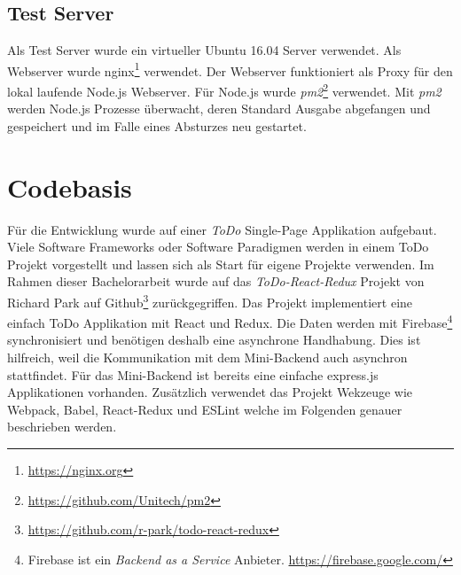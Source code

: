 \subsection{Test Server}
Als Test Server wurde ein virtueller Ubuntu 16.04 Server verwendet. Als Webserver wurde nginx\footnote{\url{https://nginx.org}} verwendet. Der Webserver funktioniert als Proxy für den lokal laufende Node.js Webserver. Für Node.js wurde \textit{pm2}\footnote{\url{https://github.com/Unitech/pm2}} verwendet. Mit \textit{pm2} werden Node.js Prozesse überwacht, deren Standard Ausgabe abgefangen und gespeichert und im Falle eines Absturzes neu gestartet.

\section{Codebasis}
Für die Entwicklung wurde auf einer \textit{ToDo} Single-Page Applikation aufgebaut. Viele Software Frameworks oder Software Paradigmen werden in einem ToDo Projekt vorgestellt und lassen sich als Start für eigene Projekte verwenden. Im Rahmen dieser Bachelorarbeit wurde auf das \textit{ToDo-React-Redux} Projekt von Richard Park auf Github\footnote{\url{https://github.com/r-park/todo-react-redux}} zurückgegriffen. Das Projekt implementiert eine einfach ToDo Applikation mit React und Redux. Die Daten werden mit Firebase\footnote{Firebase ist ein \textit{Backend as a Service} Anbieter. \url{https://firebase.google.com/}} synchronisiert und benötigen deshalb eine asynchrone Handhabung. Dies ist hilfreich, weil die Kommunikation mit dem Mini-Backend auch asynchron stattfindet. Für das Mini-Backend ist bereits eine einfache express.js Applikationen vorhanden. Zusätzlich verwendet das Projekt Wekzeuge wie Webpack, Babel, React-Redux und ESLint welche im Folgenden genauer beschrieben werden.

